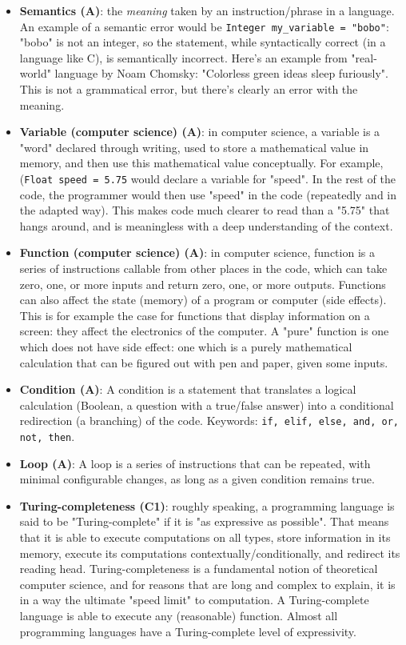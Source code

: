 \documentclass{article}
\begin{document}
\begin{itemize}
    \item \textbf{Semantics (A)}: the \textit{meaning} taken by an instruction/phrase in a language. An example of a semantic error would be \texttt{Integer my\_variable = "bobo"}: "bobo" is not an integer, so the statement, while syntactically correct (in a language like C), is semantically incorrect. Here's an example from "real-world" language by Noam Chomsky: "Colorless green ideas sleep furiously". This is not a grammatical error, but there's clearly an error with the meaning.
    
    \item \textbf{Variable (computer science) (A)}: in computer science, a variable is a "word" declared through writing, used to store a mathematical value in memory, and then use this mathematical value conceptually. For example, (\texttt{Float speed = 5.75} would declare a variable for "speed". In the rest of the code, the programmer would then use "speed" in the code (repeatedly and in the adapted way). This makes code much clearer to read than a "5.75" that hangs around, and is meaningless with a deep understanding of the context.

    \item \textbf{Function (computer science) (A)}: in computer science, function is a series of instructions callable from other places in the code, which can take zero, one, or more inputs and return zero, one, or more outputs. Functions can also affect the state (memory) of a program or computer (side effects). This is for example the case for functions that display information on a screen: they affect the electronics of the computer. A "pure" function is one which does not have side effect: one which is a purely mathematical calculation that can be figured out with pen and paper, given some inputs.
    
    \item \textbf{Condition (A)}: A condition is a statement that translates a logical calculation (Boolean, a question with a true/false answer) into a conditional redirection (a branching) of the code. Keywords: \texttt{if, elif, else, and, or, not, then}.
    
    \item \textbf{Loop (A)}: A loop is a series of instructions that can be repeated, with minimal configurable changes, as long as a given condition remains true.
    
    \item \textbf{Turing-completeness (C1)}: roughly speaking, a programming language is said to be "Turing-complete" if it is "as expressive as possible". That means that it is able to execute computations on all types, store information in its memory, execute its computations contextually/conditionally, and redirect its reading head. Turing-completeness is a fundamental notion of theoretical computer science, and for reasons that are long and complex to explain, it is in a way the ultimate "speed limit" to computation. A Turing-complete language is able to execute any (reasonable) function. Almost all programming languages have a Turing-complete level of expressivity.
    

\end{itemize}
\end{document}
